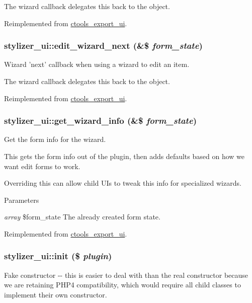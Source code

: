 The wizard callback delegates this back to the object. 

Reimplemented from \hyperlink{classctools__export__ui_a997d5570604880f989d5aaebd2f6fe29}{ctools\_\-export\_\-ui}.\hypertarget{classstylizer__ui_ad4e1744d0df6ea34e5055413af673067}{
\subsubsection[{edit\_\-wizard\_\-next}]{\setlength{\rightskip}{0pt plus 5cm}stylizer\_\-ui::edit\_\-wizard\_\-next (\&\$ {\em form\_\-state})}}
\label{classstylizer__ui_ad4e1744d0df6ea34e5055413af673067}
Wizard 'next' callback when using a wizard to edit an item.

The wizard callback delegates this back to the object. 

Reimplemented from \hyperlink{classctools__export__ui_abe09a0604f2423fbb210e09b0e6273bd}{ctools\_\-export\_\-ui}.\hypertarget{classstylizer__ui_a32963e1d98f25fb218bdfa3270286623}{
\subsubsection[{get\_\-wizard\_\-info}]{\setlength{\rightskip}{0pt plus 5cm}stylizer\_\-ui::get\_\-wizard\_\-info (\&\$ {\em form\_\-state})}}
\label{classstylizer__ui_a32963e1d98f25fb218bdfa3270286623}
Get the form info for the wizard.

This gets the form info out of the plugin, then adds defaults based on how we want edit forms to work.

Overriding this can allow child UIs to tweak this info for specialized wizards.


\begin{DoxyParams}{Parameters}
\item[{\em array}]\$form\_\-state The already created form state. \end{DoxyParams}


Reimplemented from \hyperlink{classctools__export__ui_a6cd4e76e5a3e84c8bf427641e2de7c0d}{ctools\_\-export\_\-ui}.\hypertarget{classstylizer__ui_a124bf689e31b67033705f1b5a4bbf40b}{
\subsubsection[{init}]{\setlength{\rightskip}{0pt plus 5cm}stylizer\_\-ui::init (\$ {\em plugin})}}
\label{classstylizer__ui_a124bf689e31b67033705f1b5a4bbf40b}
Fake constructor -\/-\/ this is easier to deal with than the real constructor because we are retaining PHP4 compatibility, which would require all child classes to implement their own constructor. 

